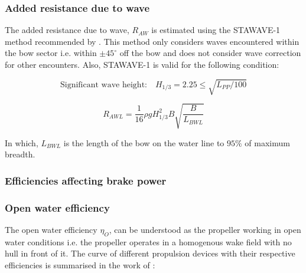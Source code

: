\pagebreak

\subsubsection{Added resistance due to wave}\label{sec:wave_resistance}

The added resistance due to wave, $R_{AW}$ is estimated using the STAWAVE-1 method recommended by . This method only considers waves encountered within the bow sector i.e. within $\pm 45^\circ$ off the bow and does not consider wave correction for other encounters. Also, STAWAVE-1 is valid for the following condition:

\begin{equation}
    \label{eqn:stawave_cond1}
    \text {Significant wave height:} \quad H_{1/3} = 2.25\leqslant\sqrt{L_{PP}/100} 
\end{equation}

\begin{equation}
    \label{eqn:stawave1}
    R_{AWL} = \frac{1}{16}\rho g H_{1/3}^2 B \sqrt{\frac{B}{L_{BWL}}} 
\end{equation}

In which, $L_{BWL}$ is the length of the bow on the water line to $95\%$ of maximum breadth.

\subsubsection{Efficiencies affecting brake power}\label{sec:Pb_efficiency}

\subsubsection*{Open water efficiency}

The open water efficiency \begin{math}\eta_O\end{math}, can be understood as the propeller working in open water conditions i.e. the propeller operates in a homogenous wake field with no hull in front of it. The curve of different propulsion devices with their respective efficiencies is summarised in the work of :

